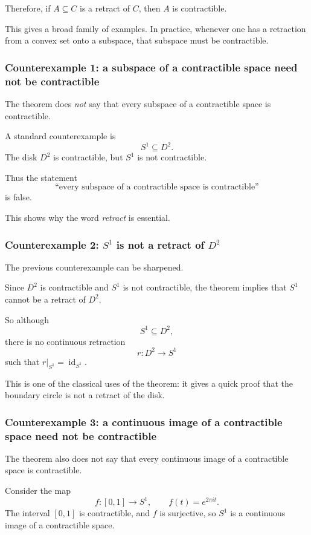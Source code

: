 \documentclass[12pt,a4paper]{article}
\theoremstyle{notespace}
\begin{document}
Therefore, if \(A\subseteq C\) is a retract of \(C\), then \(A\) is contractible.

This gives a broad family of examples. In practice, whenever one has a retraction from a convex set onto a subspace, that subspace must be contractible.

\subsubsection{Counterexample 1: a subspace of a contractible space need not be contractible}

The theorem does \emph{not} say that every subspace of a contractible space is contractible.

A standard counterexample is
\[
S^1\subseteq D^2.
\]
The disk \(D^2\) is contractible, but \(S^1\) is not contractible.

Thus the statement
\[
\text{``every subspace of a contractible space is contractible''}
\]
is false.

This shows why the word \emph{retract} is essential.

\subsubsection{Counterexample 2: \(S^1\) is not a retract of \(D^2\)}

The previous counterexample can be sharpened.

Since \(D^2\) is contractible and \(S^1\) is not contractible, the theorem implies that \(S^1\) cannot be a retract of \(D^2\).

So although
\[
S^1\subseteq D^2,
\]
there is no continuous retraction
\[
r:D^2\to S^1
\]
such that \(r|_{S^1}=\operatorname{id}_{S^1}\).

This is one of the classical uses of the theorem: it gives a quick proof that the boundary circle is not a retract of the disk.

\subsubsection{Counterexample 3: a continuous image of a contractible space need not be contractible}

The theorem also does not say that every continuous image of a contractible space is contractible.

Consider the map
\[
f:[0,1]\to S^1,
\qquad
f(t)=e^{2\pi i t}.
\]
The interval \([0,1]\) is contractible, and \(f\) is surjective, so \(S^1\) is a continuous image of a contractible space.
\end{document}

